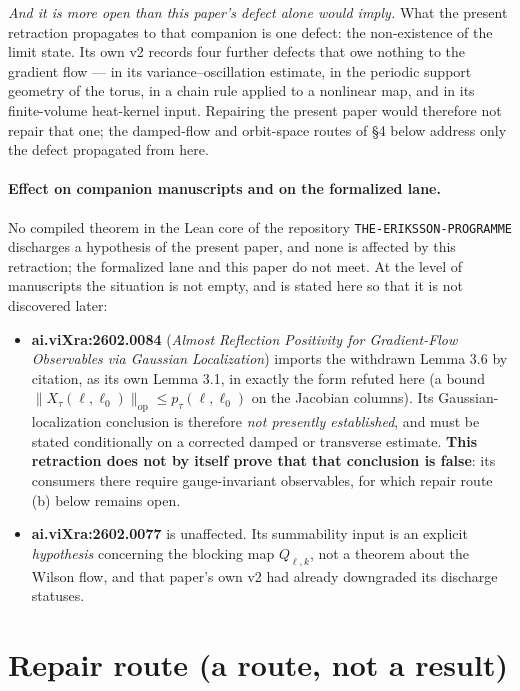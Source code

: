 \documentclass[11pt]{article}
\begin{document}
\emph{And it is more open than this paper's defect alone would imply.} What the
present retraction propagates to that companion is one defect: the non-existence of
the limit state. Its own v2 records four further defects that owe nothing to the
gradient flow --- in its variance--oscillation estimate, in the periodic support
geometry of the torus, in a chain rule applied to a nonlinear map, and in its
finite-volume heat-kernel input. Repairing the present paper would therefore not
repair that one; the damped-flow and orbit-space routes of \S4 below address only the
defect propagated from here.

\paragraph{Effect on companion manuscripts and on the formalized lane.}
No compiled theorem in the Lean core of the repository
\texttt{THE-ERIKSSON-PROGRAMME} discharges a hypothesis of the present paper, and none
is affected by this retraction; the formalized lane and this paper do not meet.
At the level of manuscripts the situation is not empty, and is stated here so that it
is not discovered later:
\begin{itemize}
\item \textbf{ai.viXra:2602.0084} (\emph{Almost Reflection Positivity for
Gradient-Flow Observables via Gaussian Localization}) imports the withdrawn Lemma 3.6
by citation, as its own Lemma 3.1, in exactly the form refuted here (a bound
$\|X_\tau(\ell,\ell_0)\|_{\mathrm{op}}\le p_\tau(\ell,\ell_0)$ on the Jacobian
columns). Its Gaussian-localization conclusion is therefore \emph{not presently
established}, and must be stated conditionally on a corrected damped or transverse
estimate. \textbf{This retraction does not by itself prove that that conclusion is
false}: its consumers there require gauge-invariant observables, for which repair
route (b) below remains open.
\item \textbf{ai.viXra:2602.0077} is unaffected. Its summability input is an explicit
\emph{hypothesis} concerning the blocking map $Q_{\ell,k}$, not a theorem about the
Wilson flow, and that paper's own v2 had already downgraded its discharge statuses.
\end{itemize}

\section{Repair route (a route, not a result)}
\end{document}
